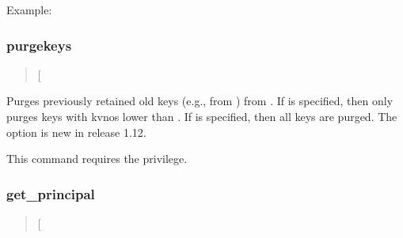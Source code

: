 \documentclass[letterpaper,10pt,english]{sphinxmanual}
\begin{document}
Example:

%
\begin{sphinxVerbatim}[commandchars=\\\{\}]
  
    
    
   
\end{sphinxVerbatim}


\subsubsection{purgekeys}
\label{\detokenize{admin/admin_commands/kadmin_local:id6}}\label{\detokenize{admin/admin_commands/kadmin_local:purgekeys}}\begin{quote}

 {[}\textbar{} \sphinxstyleemphasis{oldest\_kvno\_to\_keep}{]} 
\end{quote}

Purges previously retained old keys (e.g., from ) from .  If  is specified, then
only purges keys with kvnos lower than .  If
 is specified, then all keys are purged.  The  option
is new in release 1.12.

This command requires the  privilege.


\subsubsection{get\_principal}
\label{\detokenize{admin/admin_commands/kadmin_local:get-principal}}\label{\detokenize{admin/admin_commands/kadmin_local:id7}}\begin{quote}

 {[}\sphinxstylestrong{-terse}{]} 
\end{quote}
\end{document}
